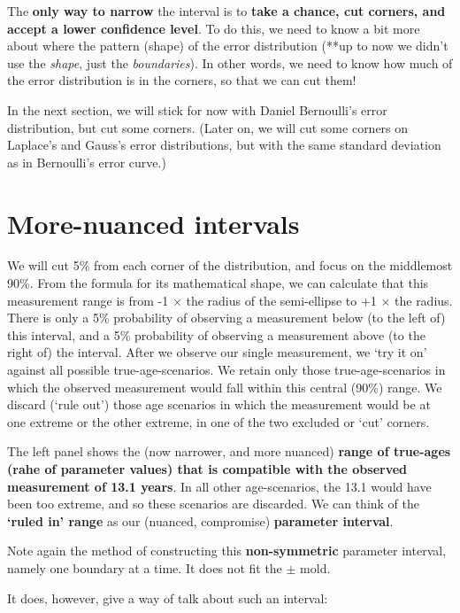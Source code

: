 \documentclass[]{book}
\begin{document}
The \textbf{only way to narrow} the interval is to \textbf{take a chance, cut corners, and accept a lower confidence level}. To do this, we need to know a bit more about where the pattern (shape) of the error distribution (**up to now we didn't use the \emph{shape}, just the \emph{boundaries}). In other words, we need to know how much of the error distribution is in the corners, so that we can cut them!

In the next section, we will stick for now with Daniel Bernoulli's error distribution, but cut some corners. (Later on, we will cut some corners on Laplace's and Gauss's error distributions, but with the same standard deviation as in Bernoulli's error curve.)

\hypertarget{more-nuanced-intervals}{%
\section{More-nuanced intervals}\label{more-nuanced-intervals}}

We will cut 5\% from each corner of the distribution, and focus on the middlemost 90\%. From the formula for its mathematical shape, we can calculate that this measurement range is from
-1 \(\times\) the radius of the semi-ellipse to
+1 \(\times\) the radius. There is only a 5\% probability of observing a measurement below (to the left of) this interval, and a 5\% probability of observing a measurement above (to the right of) the interval. After we observe our single measurement, we `try it on' against all possible true-age-scenarios. We retain only those true-age-scenarios in which the observed measurement would fall within this central (90\%) range. We discard (`rule out') those age scenarios in which the measurement would be at one extreme or the other extreme, in one of the two excluded or `cut' corners.

The left panel shows the (now narrower, and more nuanced) \textbf{range of true-ages (rahe of parameter values) that is compatible with the observed measurement of 13.1 years}. In all other age-scenarios, the 13.1 would have been too extreme, and so these scenarios are discarded. We can think of the \textbf{`ruled in' range} as our (nuanced, compromise) \textbf{parameter interval}.

Note again the method of constructing this \textbf{non-symmetric} parameter interval, namely one boundary at a time. It does not fit the \(\pm\) mold.

It does, however, give a way of talk about such an interval:
\end{document}
